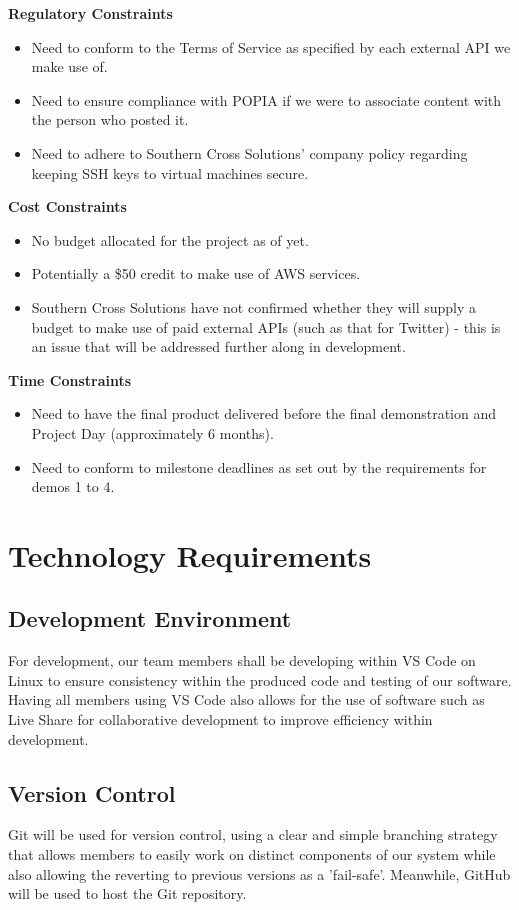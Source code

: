 \documentclass[12pt]{article}
\begin{document}
\textbf{Regulatory Constraints}
\begin{itemize}
  \item Need to conform to the Terms of Service as specified by each external API we make use of.
  \item Need to ensure compliance with POPIA if we were to associate content with the person who posted it.
  \item Need to adhere to Southern Cross Solutions' company policy regarding keeping SSH keys to virtual machines secure.
\end{itemize}

\textbf{Cost Constraints}
\begin{itemize}
  \item No budget allocated for the project as of yet.
  \item Potentially a \$50 credit to make use of AWS services.
  \item Southern Cross Solutions have not confirmed whether they will supply a budget to make use of paid external APIs (such as that for Twitter) - this is an issue that will be addressed further along in development.
\end{itemize}

\textbf{Time Constraints}
\begin{itemize}
  \item Need to have the final product delivered before the final demonstration and Project Day (approximately 6 months).
  \item Need to conform to milestone deadlines as set out by the requirements for demos 1 to 4.
\end{itemize}

\newpage

\section{Technology Requirements}

\subsection{Development Environment}
For development, our team members shall be developing within VS Code on Linux to ensure consistency within the produced code and testing of our software. Having all members using VS Code also allows for the use of software such as Live Share for collaborative development to improve efficiency within development.

\subsection{Version Control}
Git will be used for version control, using a clear and simple branching strategy that allows members to easily work on distinct components of our system while also allowing the reverting to previous versions as a 'fail-safe'. Meanwhile, GitHub will be used to host the Git repository.
\end{document}
